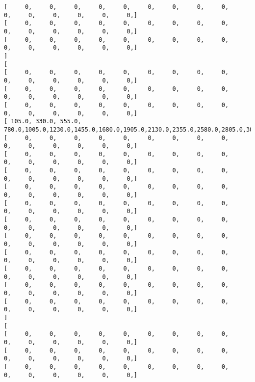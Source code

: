 \documentclass[11pt]{article}
\begin{document}
\begin{Verbatim}[commandchars=\\\{\}]
[      0,      0,      0,      0,      0,      0,      0,      0,      0,      0,      0,      0,      0,      0,      0, ]
[      0,      0,      0,      0,      0,      0,      0,      0,      0,      0,      0,      0,      0,      0,      0, ]
[      0,      0,      0,      0,      0,      0,      0,      0,      0,      0,      0,      0,      0,      0,      0, ]
]
[
[      0,      0,      0,      0,      0,      0,      0,      0,      0,      0,      0,      0,      0,      0,      0, ]
[      0,      0,      0,      0,      0,      0,      0,      0,      0,      0,      0,      0,      0,      0,      0, ]
[      0,      0,      0,      0,      0,      0,      0,      0,      0,      0,      0,      0,      0,      0,      0, ]
[  105.0,  330.0,  555.0,  780.0, 1005.0, 1230.0, 1455.0, 1680.0, 1905.0, 2130.0, 2355.0, 2580.0, 2805.0, 3030.0, 3255.0, ]
[      0,      0,      0,      0,      0,      0,      0,      0,      0,      0,      0,      0,      0,      0,      0, ]
[      0,      0,      0,      0,      0,      0,      0,      0,      0,      0,      0,      0,      0,      0,      0, ]
[      0,      0,      0,      0,      0,      0,      0,      0,      0,      0,      0,      0,      0,      0,      0, ]
[      0,      0,      0,      0,      0,      0,      0,      0,      0,      0,      0,      0,      0,      0,      0, ]
[      0,      0,      0,      0,      0,      0,      0,      0,      0,      0,      0,      0,      0,      0,      0, ]
[      0,      0,      0,      0,      0,      0,      0,      0,      0,      0,      0,      0,      0,      0,      0, ]
[      0,      0,      0,      0,      0,      0,      0,      0,      0,      0,      0,      0,      0,      0,      0, ]
[      0,      0,      0,      0,      0,      0,      0,      0,      0,      0,      0,      0,      0,      0,      0, ]
[      0,      0,      0,      0,      0,      0,      0,      0,      0,      0,      0,      0,      0,      0,      0, ]
[      0,      0,      0,      0,      0,      0,      0,      0,      0,      0,      0,      0,      0,      0,      0, ]
[      0,      0,      0,      0,      0,      0,      0,      0,      0,      0,      0,      0,      0,      0,      0, ]
]
[
[      0,      0,      0,      0,      0,      0,      0,      0,      0,      0,      0,      0,      0,      0,      0, ]
[      0,      0,      0,      0,      0,      0,      0,      0,      0,      0,      0,      0,      0,      0,      0, ]
[      0,      0,      0,      0,      0,      0,      0,      0,      0,      0,      0,      0,      0,      0,      0, ]

\end{Verbatim}
\end{document}
